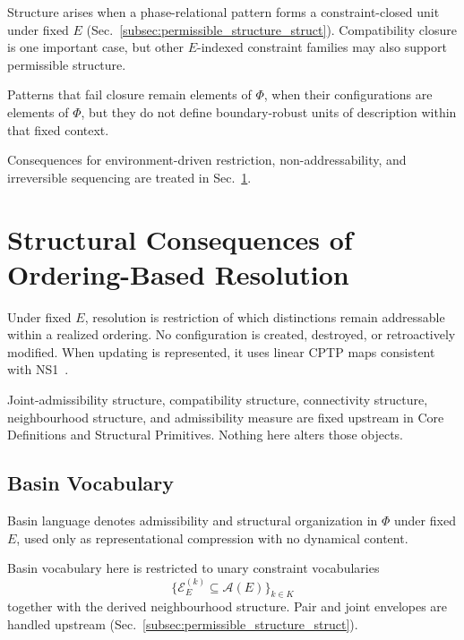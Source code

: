 \documentclass[aps,prx,onecolumn,11pt]{revtex4-2}
\theoremstyle{plain}
\theoremstyle{definition}
\theoremstyle{remark}
\begin{document}
Structure arises when a phase-relational pattern forms a
constraint-closed unit under fixed \(E\)
(Sec.~\ref{subsec:permissible_structure_struct}). Compatibility closure
is one important case, but other \(E\)-indexed constraint families may
also support permissible structure.

Patterns that fail closure remain elements of \(\Phi\), when their
configurations are elements of \(\Phi\), but they do not define
boundary-robust units of description within that fixed context.

Consequences for environment-driven restriction, non-addressability, and
irreversible sequencing are treated in
Sec.~\ref{sec:structural_ordering_resolution}.

\section{Structural Consequences of Ordering-Based Resolution}
\label{sec:structural_ordering_resolution}

Under fixed \(E\), resolution is restriction of which distinctions
remain addressable within a realized ordering. No configuration is
created, destroyed, or retroactively modified. When updating is
represented, it uses linear CPTP maps consistent with
NS1~\cite{Kraus1983,NielsenChuang2010,Watrous2018}.

Joint-admissibility structure, compatibility structure, connectivity
structure, neighbourhood structure, and admissibility measure are fixed
upstream in Core Definitions and Structural Primitives. Nothing here
alters those objects.

\subsection{Basin Vocabulary}
\label{subsec:ordering_resolution_scope}

Basin language denotes admissibility and structural organization in
\(\Phi\) under fixed \(E\), used only as representational compression
with no dynamical content.

Basin vocabulary here is restricted to unary constraint vocabularies
\[
\{\mathcal{E}^{(k)}_E\subseteq\mathcal{A}(E)\}_{k\in K}
\]
together with the derived neighbourhood structure. Pair and joint
envelopes are handled upstream
(Sec.~\ref{subsec:permissible_structure_struct}).
\end{document}
